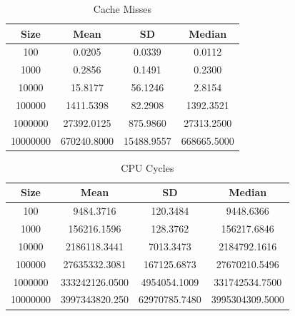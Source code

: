 \documentclass[a4paper,oneside,12pt]{book}
\begin{document}
\begin{table}[H]
    \centering
    \small
    \caption{Cache Misses}
    \vspace{1em}
    \begin{tabular}{ | c | c c c| }
        \hline
        Size     & Mean           & SD            & Median \\
        \hline
        100      & 0.0205         & 0.0339        & 0.0112 \\
        1000     & 0.2856         & 0.1491        & 0.2300 \\
        10000    & 15.8177        & 56.1246       & 2.8154 \\
        100000   & 1411.5398      & 82.2908       & 1392.3521 \\
        1000000  & 27392.0125     & 875.9860      & 27313.2500 \\
        10000000 & 670240.8000    & 15488.9557    & 668665.5000 \\
        \hline
    \end{tabular}
\end{table}

\begin{table}[H]
    \centering
    \small
    \caption{CPU Cycles}
    \vspace{1em}
    \begin{tabular}{ | c | c c c | }
        \hline
        Size     & Mean           & SD            & Median \\
        \hline
        100      & 9484.3716      & 120.3484      & 9448.6366 \\
        1000     & 156216.1596    & 128.3762      & 156217.6846 \\
        10000    & 2186118.3441   & 7013.3473     & 2184792.1616 \\
        100000   & 27635332.3081  & 167125.6873   & 27670210.5496 \\
        1000000  & 333242126.0500 & 4954054.1009  & 331742534.7500 \\
        10000000 & 3997343820.250 & 62970785.7480 & 3995304309.5000 \\
        \hline
    \end{tabular}
\end{table}
    
\end{document}
